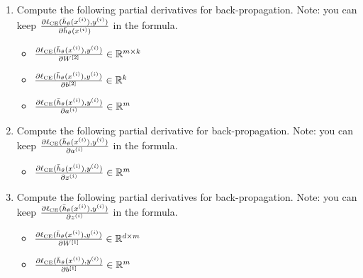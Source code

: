 \item {} 


\begin{enumerate}[label=\roman*.]
    \item {} Compute the following partial derivatives for back-propagation.
    Note: you can keep $\frac{\partial \ell_\textup{CE}(\bar{h}_{\theta}(x^{(i)}), y^{(i)})}{\partial \bar{h}_{\theta}(x^{(i)})}$ in the formula.
    \begin{itemize}
        \item $\frac{\partial \ell_\textup{CE}(\bar{h}_{\theta}(x^{(i)}), y^{(i)})}{\partial W^{[2]}} \in \mathbb{R}^{m \times k}$
        \item $\frac{\partial \ell_\textup{CE}(\bar{h}_{\theta}(x^{(i)}), y^{(i)})}{\partial b^{[2]}} \in \mathbb{R}^k$
        \item $\frac{\partial \ell_\textup{CE}(\bar{h}_{\theta}(x^{(i)}), y^{(i)})}{\partial a^{(i)}} \in \mathbb{R}^m$
    \end{itemize}

    \item {} Compute the following partial derivative for back-propagation.
    Note: you can keep $\frac{\partial \ell_\textup{CE}(\bar{h}_{\theta}(x^{(i)}), y^{(i)})}{\partial a^{(i)}}$ in the formula.
    \begin{itemize}
        \item $\frac{\partial \ell_\textup{CE}(\bar{h}_{\theta}(x^{(i)}), y^{(i)})}{\partial z^{(i)}} \in \mathbb{R}^m$
    \end{itemize}

    \item {} Compute the following partial derivatives for back-propagation.
    Note: you can keep $\frac{\partial \ell_\textup{CE}(\bar{h}_{\theta}(x^{(i)}), y^{(i)})}{\partial z^{(i)}}$ in the formula.
    \begin{itemize}
        \item $\frac{\partial \ell_\textup{CE}(\bar{h}_{\theta}(x^{(i)}), y^{(i)})}{\partial W^{[1]}} \in \mathbb{R}^{d \times m}$
        \item $\frac{\partial \ell_\textup{CE}(\bar{h}_{\theta}(x^{(i)}), y^{(i)})}{\partial b^{[1]}} \in \mathbb{R}^m$
    \end{itemize}


\end{enumerate}
